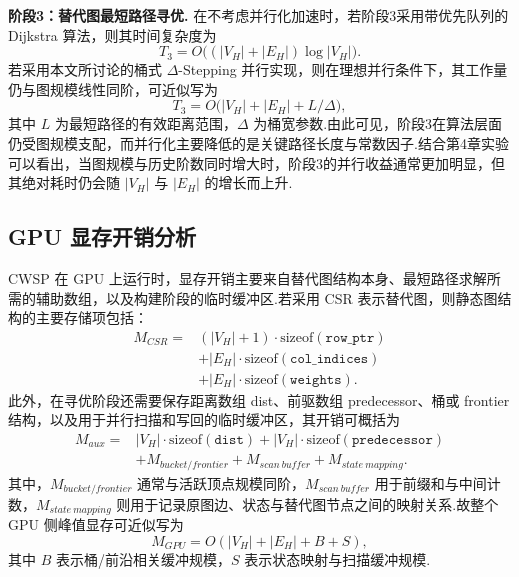 \textbf{阶段3：替代图最短路径寻优.} 在不考虑并行化加速时，若阶段3采用带优先队列的 Dijkstra 算法，则其时间复杂度为
\begin{equation}
    T_3 = O\bigl((|V_H|+|E_H|)\log |V_H|\bigr).
\end{equation}
若采用本文所讨论的桶式 $\Delta$-Stepping 并行实现，则在理想并行条件下，其工作量仍与图规模线性同阶，可近似写为
\begin{equation}
    T_3 = O\bigl(|V_H|+|E_H|+L/\Delta\bigr),
\end{equation}
其中 $L$ 为最短路径的有效距离范围，$\Delta$ 为桶宽参数.由此可见，阶段3在算法层面仍受图规模支配，而并行化主要降低的是关键路径长度与常数因子.结合第4章实验可以看出，当图规模与历史阶数同时增大时，阶段3的并行收益通常更加明显，但其绝对耗时仍会随 $|V_H|$ 与 $|E_H|$ 的增长而上升.

\subsection{GPU 显存开销分析}

CWSP 在 GPU 上运行时，显存开销主要来自替代图结构本身、最短路径求解所需的辅助数组，以及构建阶段的临时缓冲区.若采用 CSR 表示替代图，则静态图结构的主要存储项包括：
\begin{equation}
\begin{aligned}
    M_{CSR} ={}& (|V_H|+1)\cdot \text{sizeof}(\texttt{row\_ptr}) \\
    &+ |E_H|\cdot \text{sizeof}(\texttt{col\_indices}) \\
    &+ |E_H|\cdot \text{sizeof}(\texttt{weights}).
\end{aligned}
\end{equation}
此外，在寻优阶段还需要保存距离数组 dist、前驱数组 predecessor、桶或 frontier 结构，以及用于并行扫描和写回的临时缓冲区，其开销可概括为
\begin{equation}
\begin{aligned}
    M_{aux} ={}& |V_H|\cdot \text{sizeof}(\texttt{dist}) + |V_H|\cdot \text{sizeof}(\texttt{predecessor}) \\
    &+ M_{bucket/frontier} + M_{scan\ buffer} + M_{state\ mapping}.
\end{aligned}
\end{equation}
其中，$M_{bucket/frontier}$ 通常与活跃顶点规模同阶，$M_{scan\ buffer}$ 用于前缀和与中间计数，$M_{state\ mapping}$ 则用于记录原图边、状态与替代图节点之间的映射关系.故整个 GPU 侧峰值显存可近似写为
\begin{equation}
    M_{GPU} = O(|V_H|+|E_H|+B+S),
\end{equation}
其中 $B$ 表示桶/前沿相关缓冲规模，$S$ 表示状态映射与扫描缓冲规模.

